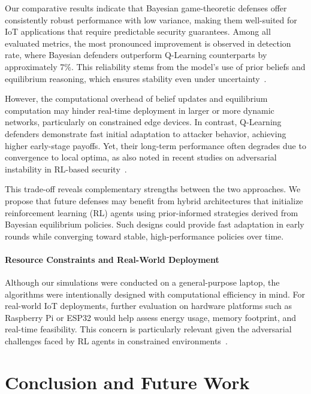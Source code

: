\documentclass[conference]{IEEEtran}
\begin{document}
Our comparative results indicate that Bayesian game-theoretic defenses offer consistently robust performance with low variance, making them well-suited for IoT applications that require predictable security guarantees. Among all evaluated metrics, the most pronounced improvement is observed in detection rate, where Bayesian defenders outperform Q-Learning counterparts by approximately 7\%. This reliability stems from the model's use of prior beliefs and equilibrium reasoning, which ensures stability even under uncertainty~\cite{zeng2023comparison}.

However, the computational overhead of belief updates and equilibrium computation may hinder real-time deployment in larger or more dynamic networks, particularly on constrained edge devices. In contrast, Q-Learning defenders demonstrate fast initial adaptation to attacker behavior, achieving higher early-stage payoffs. Yet, their long-term performance often degrades due to convergence to local optima, as also noted in recent studies on adversarial instability in RL-based security~\cite{wang2023adversarial}.

This trade-off reveals complementary strengths between the two approaches. We propose that future defenses may benefit from hybrid architectures that initialize reinforcement learning (RL) agents using prior-informed strategies derived from Bayesian equilibrium policies. Such designs could provide fast adaptation in early rounds while converging toward stable, high-performance policies over time.

\paragraph{Resource Constraints and Real-World Deployment}

Although our simulations were conducted on a general-purpose laptop, the algorithms were intentionally designed with computational efficiency in mind. For real-world IoT deployments, further evaluation on hardware platforms such as Raspberry Pi or ESP32 would help assess energy usage, memory footprint, and real-time feasibility. This concern is particularly relevant given the adversarial challenges faced by RL agents in constrained environments~\cite{wang2023adversarial}.

\section{Conclusion and Future Work}
\end{document}
